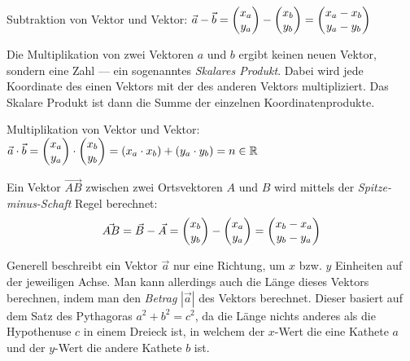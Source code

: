 Subtraktion von Vektor und Vektor: $\vec{a} - \vec{b} = \begin{pmatrix}x_{a}\\y_{a}\end{pmatrix} - \begin{pmatrix}x_{b}\\y_{b}\end{pmatrix} = \begin{pmatrix}x_{a} - x_{b} \\ y_{a} - y_{b}\end{pmatrix}$

Die Multiplikation von zwei Vektoren $a$ und $b$ ergibt keinen neuen Vektor, sondern eine Zahl --- ein sogenanntes \emph{Skalares Produkt}. Dabei wird jede Koordinate des einen Vektors mit der des anderen Vektors multipliziert. Das Skalare Produkt ist dann die Summe der einzelnen Koordinatenprodukte.

Multiplikation von Vektor und Vektor: $\vec{a} \cdot \vec{b} = \begin{pmatrix}x_{a} \\ y_{a}\end{pmatrix} \cdot \begin{pmatrix}x_{b} \\ y_{b}\end{pmatrix} = (x_{a} \cdot x_{b}) + (y_{a} \cdot y_{b}) = n \in \mathbb{R}$

\pagebreak



Ein Vektor $\vec{AB}$ zwischen zwei Ortsvektoren $A$ und $B$ wird mittels der \emph{Spitze-minus-Schaft} Regel berechnet:
$$ \vec{AB} = \vec{B} - \vec{A} = \begin{pmatrix}x_{b}\\y_{b}\end{pmatrix} - \begin{pmatrix}x_{a}\\y_{a}\end{pmatrix} = \begin{pmatrix}x_{b}-x_{a}\\y_{b}-y_{a}\end{pmatrix}$$


Generell beschreibt ein Vektor $\vec{a}$ nur eine Richtung, um $x$ bzw. $y$ Einheiten auf der jeweiligen Achse. Man kann allerdings auch die L\"{a}nge dieses Vektors berechnen, indem man den \emph{Betrag} $|\vec{a}|$ des Vektors berechnet. Dieser basiert auf dem Satz des Pythagoras $a^2 + b^2 = c^2$, da die L\"{a}nge nichts anderes als die Hypothenuse $c$ in einem Dreieck ist, in welchem der $x$-Wert die eine Kathete $a$ und der $y$-Wert die andere Kathete $b$ ist.

\begin{figure}[h!]
  \centering
  \large
\end{figure}

